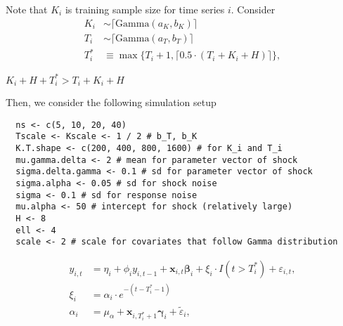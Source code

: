 \documentclass[11pt]{article}
\def\mbf#1{\mathbf{#1}} %
\def\mrm#1{\mathrm{#1}} %
\def\bs#1{\boldsymbol{#1}}
\newcommand{\ceil}[1]{\lceil #1 \rceil}
\theoremstyle{definition}
\begin{document}
Note that $K_i$ is training sample size for time series $i$. Consider
\begin{align*}
  K_i & \sim \ceil{\mrm{Gamma}(a_{K}, b_K)}\\
   T_i & \sim \ceil{\mrm{Gamma}(a_{T}, b_T)} \\
  T_i^* &\equiv \max\{T_i+1, \ceil{0.5 \cdot(T_i+K_i+H)}\},
\end{align*}

$K_i+H+T_i^* > T_i+K_i+H$

 Then, we consider the following simulation setup
\begin{verbatim}
  ns <- c(5, 10, 20, 40)
  Tscale <- Kscale <- 1 / 2 # b_T, b_K 
  K.T.shape <- c(200, 400, 800, 1600) # for K_i and T_i
  mu.gamma.delta <- 2 # mean for parameter vector of shock
  sigma.delta.gamma <- 0.1 # sd for parameter vector of shock
  sigma.alpha <- 0.05 # sd for shock noise  
  sigma <- 0.1 # sd for response noise
  mu.alpha <- 50 # intercept for shock (relatively large)
  H <- 8 
  ell <- 4
  scale <- 2 # scale for covariates that follow Gamma distribution
\end{verbatim}

\begin{align*}
  y_{i,t} &= \eta_i + \phi_i y_{i,t-1} + \mbf{x}_{i,t} \bs{\beta}_i + \xi_i\cdot  I(t > T_i^*) + \varepsilon_{i,t},\\
  \xi_i &= \alpha_i \cdot e^{-(t-T_i^*-1)} \\
  \alpha_i &= \mu_{\alpha} + \mbf{x}_{i,T_i^*+1}\bs{\gamma}_i + \tilde{\varepsilon}_{i},
\end{align*}











%

  
\end{document}
